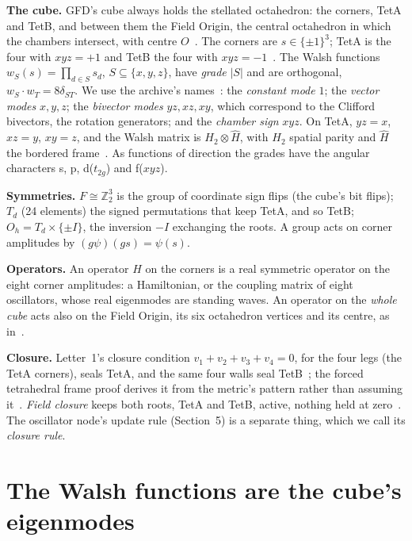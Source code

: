 \documentclass[twocolumn]{iopjournal}
\theoremstyle{definition}
\theoremstyle{remark}
\begin{document}
\textbf{The cube.} GFD's cube always holds the stellated octahedron:
the corners, TetA and TetB, and between them the Field Origin, the
central octahedron in which the chambers intersect, with centre
$O$~\cite{NelsonColes}. The corners are $s \in \{\pm1\}^3$; TetA is the four
with $xyz = +1$ and TetB the four with $xyz = -1$~\cite{NelsonHadamard}.
The Walsh functions $w_S(s) = \prod_{d\in S}s_d$, $S \subseteq \{x, y,
z\}$, have \emph{grade} $\lvert S\rvert$ and are orthogonal, $w_S \cdot
w_T = 8\delta_{ST}$. We use the archive's names~\cite{NelsonCoupling}: the
\emph{constant mode} $1$; the \emph{vector modes} $x, y, z$; the
\emph{bivector modes} $yz, xz, xy$, which correspond to the Clifford
bivectors, the rotation generators; and the \emph{chamber sign} $xyz$. On
TetA, $yz = x$, $xz = y$, $xy = z$, and the Walsh matrix is $H_2 \otimes
\hat H$, with $H_2$ spatial parity and $\hat H$ the bordered
frame~\cite{NelsonHadamard}. As functions of direction the grades have the
angular characters s, p, d($t_{2g}$) and f($xyz$).

\textbf{Symmetries.} $F \cong \mathbb Z_2^3$ is the group of coordinate
sign flips (the cube's bit flips); $T_d$ (24 elements) the signed
permutations that keep TetA, and so TetB; $O_h = T_d \times \{\pm I\}$,
the inversion $-I$ exchanging the roots. A group acts on corner amplitudes
by $(g\psi)(gs) = \psi(s)$.

\textbf{Operators.} An operator $H$ on the corners is a real symmetric
operator on the eight corner amplitudes: a Hamiltonian, or the coupling
matrix of eight oscillators, whose real eigenmodes are standing waves.
An operator on the \emph{whole cube} acts also on the Field Origin, its
six octahedron vertices and its centre, as in~\cite{NelsonVortex}.

\textbf{Closure.} Letter~1's closure condition $v_1 + v_2 + v_3 + v_4 = 0$,
for the four legs (the TetA corners), seals TetA, and the same four walls
seal TetB~\cite{NelsonL1, NelsonFieldClosure}; the forced tetrahedral frame
proof derives it from the metric's pattern rather than assuming
it~\cite{NelsonForced}. \emph{Field closure} keeps both roots, TetA and
TetB, active, nothing held at zero~\cite{NelsonL3}. The oscillator node's
update rule (Section~5) is a separate thing, which we call its
\emph{closure rule}.


\section{The Walsh functions are the cube's eigenmodes}
\end{document}
